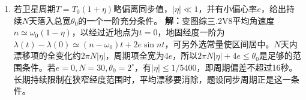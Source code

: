 \documentclass[UTF8,fontset=fandol,a4paper,11pt]{ctexart}
\begin{document}
\begin{enumerate}
\item 若卫星周期$T=T_0(1+\eta)$略偏离同步值，$|\eta|\ll1$，并有小偏心率$e$，给出持续$N$天落入总宽$\theta_0$的一个一阶充分条件。
\textbf{解：}变图综三.2V8平均角速度$n\simeq\omega_0(1-\eta)$，以经过近地点为$t=0$，地固经度一阶为$\lambda(t)-\lambda(0)\simeq(n-\omega_0)t+2e\sin nt$，可另外选常量使区间居中。$N$天内漂移项的全变化约$2\pi N|\eta|$，周期项全宽为$4e$，所以$2\pi N|\eta|+4e\le\theta_0$是足够的范围条件。若$e=0,N=30,\theta_0=2^\circ$，有$|\eta|\le1/5400$，即周期偏差不超过16秒。长期持续限制在狭窄经度范围时，平均漂移要消除，题设同步周期正是这一条件。
\begin{center}\begin{minipage}{.98\linewidth}\centering
{}
\end{minipage}
\end{center}
\end{enumerate}
\end{document}
